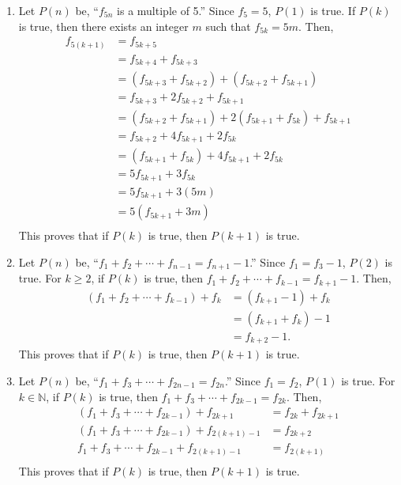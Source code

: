 \begin{enumerate}
\begin{enumerate}
\item Let $P \left( n \right)$ be, ``$f_{5n}$ is a multiple of 5.''  Since $f_5 = 5$, 
$P \left( 1 \right)$ is true.  If $P \left( k \right)$ is true, then there exists an integer $m$ such that $f_{5k} = 5m$.  Then,
\[
\begin{aligned}
f_{5 \left( k + 1 \right)} &= f_{5k + 5} \\
                           &= f_{5k+4} + f_{5k+3} \\
                 &= \left( f_{5k+3} + f_{5k+2} \right) + \left( f_{5k+2} + f_{5k+1} \right) \\
                 &= f_{5k+3} + 2 f_{5k+2} + f_{5k+1} \\
         &= \left( f_{5k+2} + f_{5k+1} \right) + 2 \left( f_{5k+1} + f_{5k} \right) + f_{5k+1} \\
         &= f_{5k+2} +4 f_{5k+1} + 2 f_{5k} \\
         &= \left( f_{5k+1} + f_{5k} \right) + 4f_{5k + 1} + 2 f_{5k} \\
                 &= 5 f_{5k+1} + 3 f_{5k} \\
                 &= 5 f_{5k+1} + 3 \left( 5m \right) \\
                 &= 5 \left( f_{5k+1} + 3m \right) \\
\end{aligned}
\]
This proves that if $P \left( k \right)$ is true, then $P \left( k + 1\right)$ is true.

\item Let $P \left( n \right)$ be, ``$f_1  + f_2  +  \cdots  + f_{n - 1}  = f_{n + 1}  - 1$.''  Since $f_1 = f_3 - 1$, $P \left( 2 \right)$ is true.  For $k \geq 2$, if $P \left( k \right)$ is true, then $f_1  + f_2  +  \cdots  + f_{k - 1}  = f_{k + 1}  - 1$.  Then,
\[
\begin{aligned}
\left( f_1  + f_2  +  \cdots  + f_{k - 1} \right) + f_k  &= \left( f_{k + 1}  - 1 \right) + f_k \\
            &= \left( f_{k+1} + f_k \right) - 1 \\
            &= f_{k+2} - 1.
\end{aligned}
\]
This proves that if $P \left( k \right)$ is true, then $P \left( k + 1\right)$ is true.

\item Let $P \left( n \right)$ be, ``$f_1  + f_3  +  \cdots  + f_{2n - 1}  = f_{2n}$.''  Since 
$f_1 = f_2$, $P \left( 1 \right)$ is true.  For $k \in \mathbb{N}$, if $P \left( k \right)$ is true, then $f_1  + f_3  +  \cdots  + f_{2k - 1}  = f_{2k}$.  Then,
\[
\begin{aligned}
\left( f_1  + f_3  +  \cdots  + f_{2k - 1} \right) + f_{2k+1}  &= 
f_{2k} + f_{2k+1} \\
\left( f_1  + f_3  +  \cdots  + f_{2k - 1} \right) + f_{2 \left( k + 1 \right) - 1}  &= 
f_{2k+2} \\
f_1  + f_3  +  \cdots  + f_{2k - 1} + f_{2 \left( k + 1 \right) - 1}  &= 
f_{2 \left(k+1 \right)} \\          
\end{aligned}
\]
This proves that if $P \left( k \right)$ is true, then $P \left( k + 1\right)$ is true.


\end{enumerate}
\end{enumerate}
